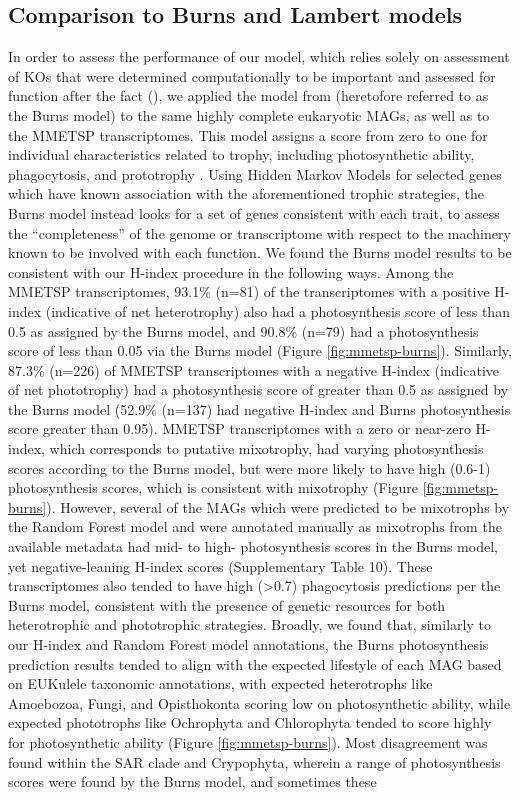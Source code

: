 \documentclass[12pt]{article}
\numberwithin{equation}{section}
\begin{document}
\subsection{Comparison to Burns and Lambert models}\label{burnssec}
In order to assess the performance of our model, which relies solely on assessment of KOs \citep{Kanehisa_2019} that were determined computationally to be important and assessed for function after the fact (), we applied the model from \cite{burns2018gene} (heretofore referred to as the Burns model) to the same highly complete eukaryotic MAGs, as well as to the MMETSP transcriptomes. This model assigns a score from zero to one for individual characteristics related to trophy, including photosynthetic ability, phagocytosis, and prototrophy \citep{burns2018gene}. Using Hidden Markov Models for selected genes which have known association with the aforementioned trophic strategies, the Burns model instead looks for a set of genes consistent with each trait, to assess the ``completeness'' of the genome or transcriptome with respect to the machinery known to be involved with each function. We found the Burns model results to be consistent with our H-index procedure in the following ways. Among the MMETSP transcriptomes, 93.1\% (n=81) of the transcriptomes with a positive H-index (indicative of net heterotrophy) also had a photosynthesis score of less than 0.5 as assigned by the Burns model, and 90.8\% (n=79) had a photosynthesis score of less than 0.05 via the Burns model (Figure \ref{fig:mmetsp-burns}). Similarly, 87.3\% (n=226)  of MMETSP transcriptomes with a negative H-index (indicative of net phototrophy) had a photosynthesis score of greater than 0.5 as assigned by the Burns model (52.9\% (n=137) had negative H-index and Burns photosynthesis score greater than 0.95). MMETSP transcriptomes with a zero or near-zero H-index, which corresponds to putative mixotrophy, had varying photosynthesis scores according to the Burns model, but were more likely to have high (0.6-1) photosynthesis scores, which is consistent with mixotrophy (Figure \ref{fig:mmetsp-burns}). However, several of the MAGs which were predicted to be mixotrophs by the Random Forest model and were annotated manually as mixotrophs from the available metadata had mid- to high- photosynthesis scores in the Burns model, yet negative-leaning H-index scores (Supplementary Table 10). These transcriptomes also tended to have high (>0.7) phagocytosis predictions per the Burns model, consistent with the presence of genetic resources for both heterotrophic and phototrophic strategies. Broadly, we found that, similarly to our H-index and Random Forest model annotations, the Burns photosynthesis prediction results tended to align with the expected lifestyle of each MAG based on EUKulele \citep{Krinos2021EUKulele} taxonomic annotations, with expected heterotrophs like Amoebozoa, Fungi, and Opisthokonta scoring low on photosynthetic ability, while expected phototrophs like Ochrophyta and Chlorophyta tended to score highly for photosynthetic ability (Figure \ref{fig:mmetsp-burns}). Most disagreement was found within the SAR clade and Crypophyta, wherein a range of photosynthesis scores were found by the Burns model, and sometimes these 
\end{document}
